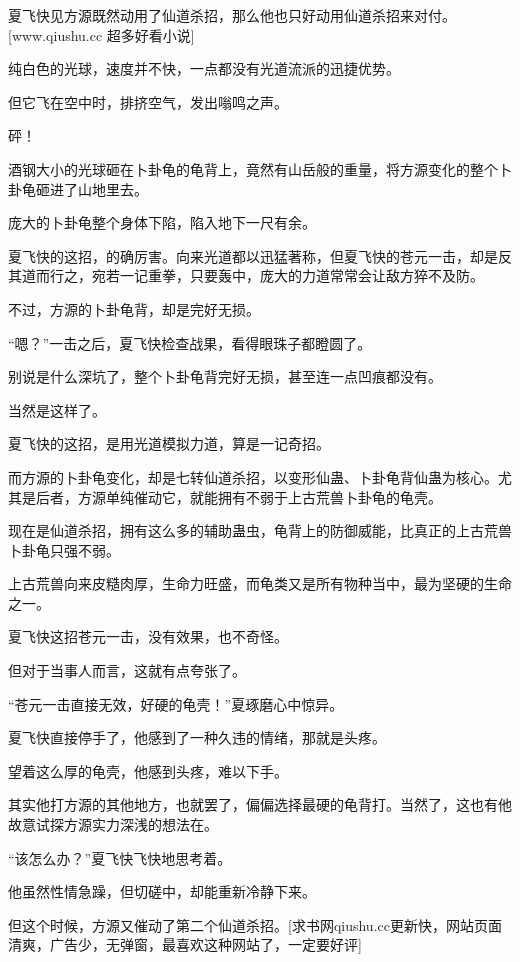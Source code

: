
\begin{this_body}

夏飞快见方源既然动用了仙道杀招，那么他也只好动用仙道杀招来对付。[www.qiushu.cc 超多好看小说]

纯白色的光球，速度并不快，一点都没有光道流派的迅捷优势。

但它飞在空中时，排挤空气，发出嗡鸣之声。

砰！

酒钢大小的光球砸在卜卦龟的龟背上，竟然有山岳般的重量，将方源变化的整个卜卦龟砸进了山地里去。

庞大的卜卦龟整个身体下陷，陷入地下一尺有余。

夏飞快的这招，的确厉害。向来光道都以迅猛著称，但夏飞快的苍元一击，却是反其道而行之，宛若一记重拳，只要轰中，庞大的力道常常会让敌方猝不及防。

不过，方源的卜卦龟背，却是完好无损。

“嗯？”一击之后，夏飞快检查战果，看得眼珠子都瞪圆了。

别说是什么深坑了，整个卜卦龟背完好无损，甚至连一点凹痕都没有。

当然是这样了。

夏飞快的这招，是用光道模拟力道，算是一记奇招。

而方源的卜卦龟变化，却是七转仙道杀招，以变形仙蛊、卜卦龟背仙蛊为核心。尤其是后者，方源单纯催动它，就能拥有不弱于上古荒兽卜卦龟的龟壳。

现在是仙道杀招，拥有这么多的辅助蛊虫，龟背上的防御威能，比真正的上古荒兽卜卦龟只强不弱。

上古荒兽向来皮糙肉厚，生命力旺盛，而龟类又是所有物种当中，最为坚硬的生命之一。

夏飞快这招苍元一击，没有效果，也不奇怪。

但对于当事人而言，这就有点夸张了。

“苍元一击直接无效，好硬的龟壳！”夏琢磨心中惊异。

夏飞快直接停手了，他感到了一种久违的情绪，那就是头疼。

望着这么厚的龟壳，他感到头疼，难以下手。

其实他打方源的其他地方，也就罢了，偏偏选择最硬的龟背打。当然了，这也有他故意试探方源实力深浅的想法在。

“该怎么办？”夏飞快飞快地思考着。

他虽然性情急躁，但切磋中，却能重新冷静下来。

但这个时候，方源又催动了第二个仙道杀招。[求书网qiushu.cc更新快，网站页面清爽，广告少，无弹窗，最喜欢这种网站了，一定要好评]


\end{this_body}
